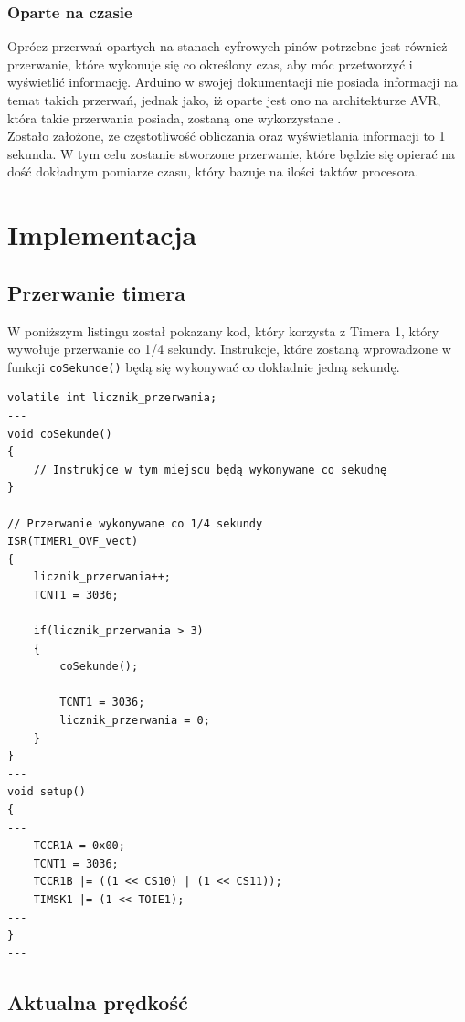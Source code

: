 \subsubsection{Oparte na czasie}
Oprócz przerwań opartych na stanach cyfrowych pinów potrzebne jest również przerwanie, które wykonuje się co określony czas, aby móc przetworzyć i wyświetlić informację. Arduino w swojej dokumentacji nie posiada informacji na temat takich przerwań, jednak jako, iż oparte jest ono na architekturze AVR, która takie przerwania posiada, zostaną one wykorzystane \cite{atmega_datasheet}.\\
Zostało założone, że częstotliwość obliczania oraz wyświetlania informacji to 1 sekunda. W tym celu zostanie stworzone przerwanie, które będzie się opierać na dość dokładnym pomiarze czasu, który bazuje na ilości taktów procesora.\\

\section{Implementacja}
\subsection{Przerwanie timera} \label{setting_timer_interupt}

W poniższym listingu został pokazany kod, który korzysta z Timera 1, który wywołuje przerwanie co 1/4 sekundy. Instrukcje, które zostaną wprowadzone w funkcji \texttt{coSekunde()} będą się wykonywać co dokładnie jedną sekundę.

\begin{lstlisting}[label=list:timer_int,caption=Ustawianie przerwania timera,
basicstyle=\footnotesize\ttfamily]
volatile int licznik_przerwania;
---
void coSekunde()
{
    // Instrukjce w tym miejscu będą wykonywane co sekudnę
}

// Przerwanie wykonywane co 1/4 sekundy
ISR(TIMER1_OVF_vect)
{
    licznik_przerwania++;
    TCNT1 = 3036;
    
    if(licznik_przerwania > 3) 
    {
        coSekunde();

        TCNT1 = 3036;
        licznik_przerwania = 0;
    }
}
---
void setup()
{
---
    TCCR1A = 0x00;
    TCNT1 = 3036;
    TCCR1B |= ((1 << CS10) | (1 << CS11));
    TIMSK1 |= (1 << TOIE1);
---
}
---
\end{lstlisting}



\subsection{Aktualna prędkość}
